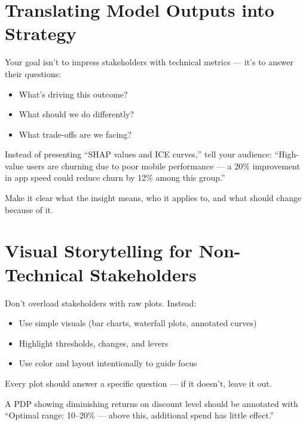\documentclass[12pt,openany]{book}
\begin{document}
\section{Translating Model Outputs into Strategy}

Your goal isn’t to impress stakeholders with technical metrics — it’s to answer their questions:
\begin{itemize}
  \item What’s driving this outcome?
  \item What should we do differently?
  \item What trade-offs are we facing?
\end{itemize}

\begin{examplebox}
Instead of presenting “SHAP values and ICE curves,” tell your audience: “High-value users are churning due to poor mobile performance — a 20\% improvement in app speed could reduce churn by 12\% among this group.”
\end{examplebox}

Make it clear what the insight means, who it applies to, and what should change because of it.



\section{Visual Storytelling for Non-Technical Stakeholders}

Don’t overload stakeholders with raw plots. Instead:
\begin{itemize}
  \item Use simple visuals (bar charts, waterfall plots, annotated curves)
  \item Highlight thresholds, changes, and levers
  \item Use color and layout intentionally to guide focus
\end{itemize}

\begin{notebox}
Every plot should answer a specific question — if it doesn’t, leave it out.
\end{notebox}

\begin{examplebox}
A PDP showing diminishing returns on discount level should be annotated with “Optimal range: 10–20\% — above this, additional spend has little effect.”
\end{examplebox}
\end{document}
